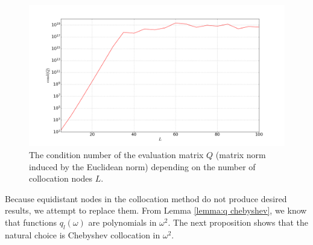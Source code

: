 \documentclass[a4paper,11pt,bibliography=totoc,listof=totoc,headinclude=true,cleardoublepage=empty,oneside]{scrbook}
\begin{document}
\begin{figure}
    \centering
    \includegraphics[width=1\linewidth]{latex//images//equi_coll/Figure_2.png}
    \caption{The condition number of the evaluation matrix $Q$ (matrix norm induced by the Euclidean norm) depending on the number of collocation nodes $L$.}
    \label{fig:eq coll cond}
\end{figure}

Because equidistant nodes in the collocation method do not produce desired results, we attempt to replace them. From Lemma \ref{lemma:q chebyshev}, we know that functions $q_l(\omega)$ are polynomials in $\omega^2$. The next proposition shows that the natural choice is Chebyshev collocation in $\omega^2$.
\end{document}
